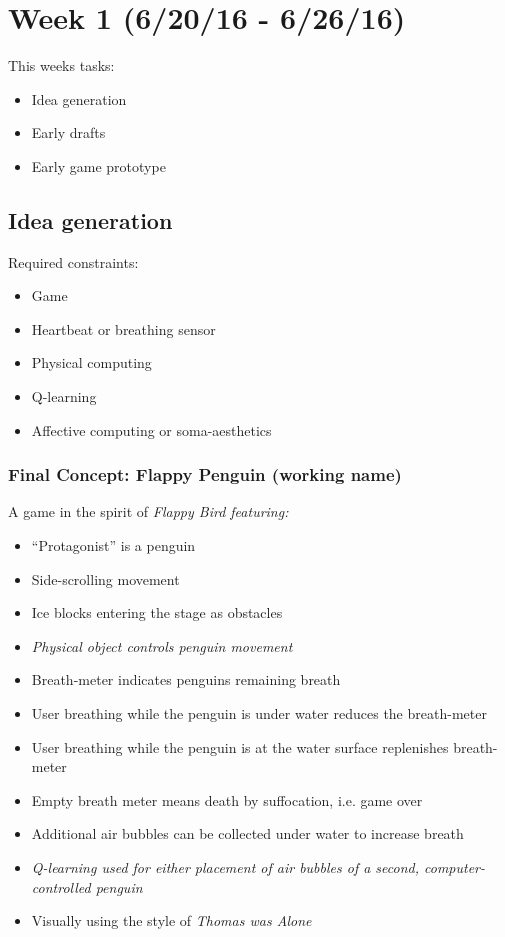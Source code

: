 \documentclass{article}
\begin{document}
\section{Week 1 (6/20/16 - 6/26/16)}
    This weeks tasks:
    \begin{itemize}
        \item Idea generation
        \item Early drafts
        \item Early game prototype
    \end{itemize}

    \subsection{Idea generation}
        Required constraints:
        \begin{itemize}
            \item Game
            \item Heartbeat or breathing sensor
            \item Physical computing
            \item Q-learning
            \item Affective computing or soma-aesthetics
        \end{itemize}

        \subsubsection{Final Concept: Flappy Penguin (working name)}
            A game in the spirit of \em Flappy Bird \em featuring:

            \begin{itemize}
                \item ``Protagonist'' is a penguin
                \item Side-scrolling movement
                \item Ice blocks entering the stage as obstacles
                \item \em Physical object \em controls penguin movement
                \item Breath-meter indicates penguins remaining breath
                \item User breathing while the penguin is under water reduces the breath-meter
                \item User breathing while the penguin is at the water surface replenishes breath-meter
                \item Empty breath meter means death by suffocation, i.e. game over
                \item Additional air bubbles can be collected under water to increase breath
                \item \em Q-learning \em used for either placement of air bubbles of a second, computer-controlled penguin
                \item Visually using the style of \em Thomas was Alone \em
            \end{itemize}
\end{document}

